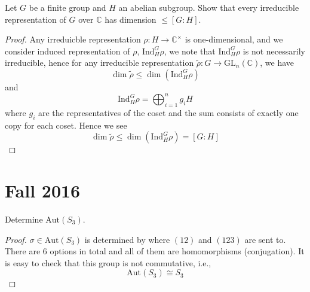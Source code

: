 \documentclass[openany]{book}
\newcommand{\C}{\mathbb{C}}
\begin{document}
\begin{prob}
    Let \(G\) be a finite group and \(H\) an abelian subgroup. Show that every irreducible representation of \(G\) over \(\mathbb{C}\) has dimension \(\leq[G:H]\).
\end{prob}
\begin{proof}
    Any irreduicble representation $\rho:H\to\mathbb{C}^\times$ is one-dimensional, and we consider induced representation of $\rho$, $\text{Ind}_H^G\rho$, we note that $\text{Ind}_H^G\rho$ is not necessarily irreducible, hence for any irreducible representation $\tilde{\rho}:G\to\text{GL}_n(\C)$, we have 
    \begin{equation*}
        \dim\tilde{\rho}\leq\dim(\text{Ind}_H^G\rho)
    \end{equation*}
    and 
    \begin{equation*}
        \text{Ind}_H^G\rho=\bigoplus_{i=1}^ng_iH
    \end{equation*}
    where $g_i$ are the representatives of the coset and the sum consists of exactly one copy for each coset. Hence we see 
    \begin{equation*}
        \dim\tilde{\rho}\leq\dim(\text{Ind}_H^G\rho)=[G:H]
    \end{equation*}
\end{proof}




\chapter{Fall 2016}



\begin{prob}
    Determine \(\text{Aut}(S_{3})\).
\end{prob}
\begin{proof}
    $\sigma\in\text{Aut}(S_3)$ is determined by where $(12)$ and $(123)$ are sent to. There are $6$ options in total and all of them are homomorphisms (conjugation). It is easy to check that this group is not commutative, i.e., 
    \begin{equation*}
        \text{Aut}(S_3)\cong S_3
    \end{equation*}
\end{proof}
\end{document}
